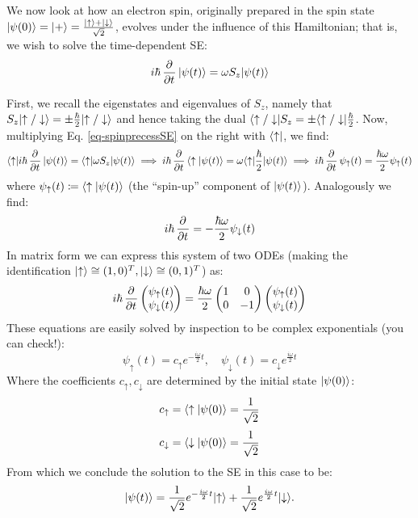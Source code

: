 We now look at how an electron spin, originally prepared in the spin state $\lvert \psi(0) \rangle = \lvert + \rangle = \frac{\lvert \uparrow \rangle + \lvert \downarrow \rangle}{\sqrt{2}}$, evolves under the influence of this Hamiltonian; that is, we wish to solve the time-dependent SE:
\begin{equation}\label{eq-spinprecessSE}
    i\hbar\dpd{}{t}\ket{\psi(t)} = \omega S_z\ket{\psi(t)}
\end{equation}

First, we recall the eigenstates and eigenvalues of $S_z$, namely that $S_z\lvert \uparrow/\downarrow \rangle = \pm \frac{\hbar}{2}\lvert \uparrow/\downarrow \rangle$ and hence taking the dual $\langle \uparrow/\downarrow \rvert S_z = \pm \langle \uparrow/\downarrow \rvert\frac{\hbar}{2}$. Now, multiplying Eq. \eqref{eq-spinprecessSE} on the right with $\langle \uparrow \rvert$, we find:
\begin{equation}
    \bra{\uparrow}i\hbar\dpd{}{t}\ket{\psi(t)} = \bra{\uparrow}\omega S_z \ket{\psi(t)} \implies i\hbar\dpd{}{t}\braket{\uparrow}{\psi(t)} = \omega\bra{\uparrow}\frac{\hbar}{2}\ket{\psi(t)} \implies i\hbar\dpd{}{t}\psi_\uparrow(t) = \frac{\hbar\omega}{2}\psi_\uparrow(t)
\end{equation}
where $\psi_\uparrow(t) \coloneqq \langle \uparrow \lvert \psi(t) \rangle$ (the ``spin-up'' component of $\lvert \psi(t) \rangle$). Analogously we find:
\begin{equation}
    i\hbar\dpd{}{t} = -\frac{\hbar\omega}{2}\psi_\downarrow(t)
\end{equation}
In matrix form we can express this system of two ODEs (making the identification $\lvert \uparrow \rangle \cong (1, 0)^T, \lvert \downarrow \rangle \cong (0, 1)^T$) as:
\begin{equation}
    i\hbar\dpd{}{t}\m{\psi_\uparrow(t) \\ \psi_\downarrow(t)} = \frac{\hbar\omega}{2}\m{1 & 0 \\ 0 & -1}\m{\psi_\uparrow(t) \\ \psi_\downarrow(t)}
\end{equation}
These equations are easily solved by inspection to be complex exponentials (you can check!):
\begin{equation}
    \psi_\uparrow(t) = c_\uparrow e^{-\frac{i\omega}{2}t}, \quad \psi_\downarrow(t) = c_\downarrow e^{\frac{i\omega}{2} t}
\end{equation}
Where the coefficients $c_\uparrow, c_\downarrow$ are determined by the initial state $\lvert \psi(0) \rangle$:
\begin{equation}
    c_\uparrow = \langle \uparrow \lvert \psi(0) \rangle = \frac{1}{\sqrt{2}}
\end{equation}
\begin{equation}
    c_\downarrow = \langle \downarrow \lvert \psi(0) \rangle = \frac{1}{\sqrt{2}}
\end{equation}
From which we conclude the solution to the SE in this case to be:
\begin{equation}\label{eq-spinprecesssoln}
    \lvert \psi(t) \rangle = \frac{1}{\sqrt{2}}e^{-\frac{i\omega}{2}t}\lvert \uparrow \rangle + \frac{1}{\sqrt{2}}e^{\frac{i\omega}{2} t}\lvert \downarrow \rangle.
\end{equation}

